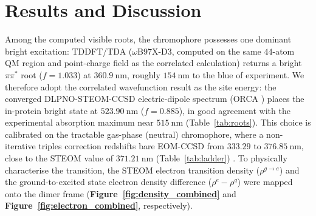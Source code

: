 \documentclass[journal=jpcbfk, manuscript=article, layout=twocolumn, doi=true]{achemso}
\begin{document}
\section{Results and Discussion}

Among the computed visible roots, the chromophore possesses one dominant bright excitation: TDDFT/TDA ($\omega$B97X-D3, computed on the same $44$-atom QM region and point-charge field as the correlated calculation) returns a bright $\pi\pi^{*}$ root ($f=1.033$) at $360.9~\mathrm{nm}$, roughly $154~\mathrm{nm}$ to the blue of experiment. We therefore adopt the correlated wavefunction result as the site energy: the converged DLPNO-STEOM-CCSD electric-dipole spectrum (ORCA \cite{neese2020orca,neese2022orca,nooijen1997steom,dutta2018ipeom,dutta2019eaeom,dutta2016dlpno}) places the in-protein bright state at $523.90~\mathrm{nm}$ ($f=0.885$), in good agreement with the experimental absorption maximum near $515~\mathrm{nm}$ (Table~\ref{tab:roots}). This choice is calibrated on the tractable gas-phase (neutral) chromophore, where a non-iterative triples correction redshifts bare EOM-CCSD from $333.29$ to $376.85~\mathrm{nm}$, close to the STEOM value of $371.21~\mathrm{nm}$ (Table~\ref{tab:ladder}) \cite{manohar2008ft,epifanovsky2021qchem}. To physically characterise the transition, the STEOM electron transition density ($\rho^{g\to e}$) and the ground-to-excited state electron density difference ($\rho^{e} - \rho^{g}$) were mapped onto the dimer frame (\textbf{Figure~\ref{fig:density_combined}} and \textbf{Figure~\ref{fig:electron_combined}}, respectively).
\end{document}
